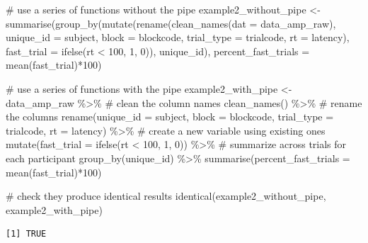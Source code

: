 \documentclass[
  letterpaper,
  DIV=11,
  numbers=noendperiod]{scrreprt}
\newenvironment{Shaded}{\begin{snugshade}}{\end{snugshade}}
\newcommand{\AttributeTok}[1]{\textcolor[rgb]{0.40,0.45,0.13}{#1}}
\newcommand{\CommentTok}[1]{\textcolor[rgb]{0.37,0.37,0.37}{#1}}
\newcommand{\DecValTok}[1]{\textcolor[rgb]{0.68,0.00,0.00}{#1}}
\newcommand{\FunctionTok}[1]{\textcolor[rgb]{0.28,0.35,0.67}{#1}}
\newcommand{\NormalTok}[1]{\textcolor[rgb]{0.00,0.23,0.31}{#1}}
\newcommand{\OtherTok}[1]{\textcolor[rgb]{0.00,0.23,0.31}{#1}}
\newcommand{\SpecialCharTok}[1]{\textcolor[rgb]{0.37,0.37,0.37}{#1}}
\begin{document}
\begin{Shaded}
\begin{Highlighting}[]
\CommentTok{\# use a series of functions without the pipe}
\NormalTok{example2\_without\_pipe }\OtherTok{\textless{}{-}} \FunctionTok{summarise}\NormalTok{(}\FunctionTok{group\_by}\NormalTok{(}\FunctionTok{mutate}\NormalTok{(}\FunctionTok{rename}\NormalTok{(}\FunctionTok{clean\_names}\NormalTok{(}\AttributeTok{dat =}\NormalTok{ data\_amp\_raw), }\AttributeTok{unique\_id =}\NormalTok{ subject, }\AttributeTok{block =}\NormalTok{ blockcode, }\AttributeTok{trial\_type =}\NormalTok{ trialcode, }\AttributeTok{rt =}\NormalTok{ latency), }\AttributeTok{fast\_trial =} \FunctionTok{ifelse}\NormalTok{(rt }\SpecialCharTok{\textless{}} \DecValTok{100}\NormalTok{, }\DecValTok{1}\NormalTok{, }\DecValTok{0}\NormalTok{)), unique\_id), }\AttributeTok{percent\_fast\_trials =} \FunctionTok{mean}\NormalTok{(fast\_trial)}\SpecialCharTok{*}\DecValTok{100}\NormalTok{) }

\CommentTok{\# use a series of functions with the pipe}
\NormalTok{example2\_with\_pipe }\OtherTok{\textless{}{-}}\NormalTok{ data\_amp\_raw }\SpecialCharTok{\%\textgreater{}\%}
  \CommentTok{\# clean the column names}
  \FunctionTok{clean\_names}\NormalTok{() }\SpecialCharTok{\%\textgreater{}\%}
  \CommentTok{\# rename the columns}
  \FunctionTok{rename}\NormalTok{(}\AttributeTok{unique\_id =}\NormalTok{ subject,}
         \AttributeTok{block =}\NormalTok{ blockcode,}
         \AttributeTok{trial\_type =}\NormalTok{ trialcode,}
         \AttributeTok{rt =}\NormalTok{ latency) }\SpecialCharTok{\%\textgreater{}\%}
  \CommentTok{\# create a new variable using existing ones}
  \FunctionTok{mutate}\NormalTok{(}\AttributeTok{fast\_trial =} \FunctionTok{ifelse}\NormalTok{(rt }\SpecialCharTok{\textless{}} \DecValTok{100}\NormalTok{, }\DecValTok{1}\NormalTok{, }\DecValTok{0}\NormalTok{)) }\SpecialCharTok{\%\textgreater{}\%}
  \CommentTok{\# summarize across trials for each participant}
  \FunctionTok{group\_by}\NormalTok{(unique\_id) }\SpecialCharTok{\%\textgreater{}\%}
  \FunctionTok{summarise}\NormalTok{(}\AttributeTok{percent\_fast\_trials =} \FunctionTok{mean}\NormalTok{(fast\_trial)}\SpecialCharTok{*}\DecValTok{100}\NormalTok{) }

\CommentTok{\# check they produce identical results}
\FunctionTok{identical}\NormalTok{(example2\_without\_pipe, example2\_with\_pipe)}
\end{Highlighting}
\end{Shaded}

\begin{verbatim}
[1] TRUE
\end{verbatim}
\end{document}
